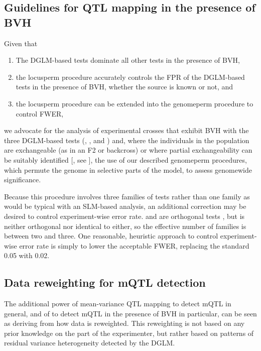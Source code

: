 \subsection{Guidelines for QTL mapping in the presence of BVH}

Given that 
\begin{enumerate}
	\item The DGLM-based tests dominate all other tests in the presence of BVH,
	\item the locusperm procedure accurately controls the FPR of the DGLM-based tests in the presence of BVH, whether the source is known or not, and
	\item the locusperm procedure can be extended into the genomeperm procedure to control FWER,
\end{enumerate}
we advocate for the analysis of experimental crosses that exhibit BVH with the three DGLM-based tests (\DGLMm, \DGLMv, and \DGLMmv) and, where the individuals in the population are exchangeable (as in an F2 or backcross) or where partial exchangeability can be suitably identified [\eg, see \citep{Churchill1994,Zou2006,Churchill2008}], the use of our described genomeperm procedures, which permute the genome in selective parts of the model, to assess genomewide significance.

Because this procedure involves three families of tests rather than one family as would be typical with an SLM-based analysis, an additional correction may be desired to control experiment-wise error rate.
\DGLMm and \DGLMv are orthogonal tests \citep{Smyth1989}, but \DGLMmv is neither orthogonal nor identical to either, so the effective number of families is between two and three.
One reasonable, heuristic approach to control experiment-wise error rate is simply to lower the acceptable FWER, \eg replacing the standard 0.05 with 0.02.

\subsection{Data reweighting for mQTL detection}
The additional power of mean-variance QTL mapping to detect mQTL in general, and of \DGLMm to detect mQTL in the presence of BVH in particular, can be seen as deriving from how data is reweighted.
This reweighting is not based on any prior knowledge on the part of the experimenter, but rather based on patterns of residual variance heterogeneity detected by the DGLM.


